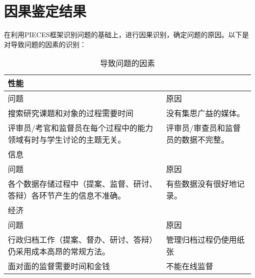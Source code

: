 \section{因果鉴定结果}

在利用PIECES框架识别问题的基础上，进行因果识别，确定问题的原因。以下是对导致问题的因素的识别：

\begin{table}[htbp]
      \centering
      \song\wuhao
      \caption{导致问题的因素}
      \label{导致问题的因素}
      \begin{tabular}{p{6cm}p{6cm}}
            \hline
            \multicolumn{2}{l}{性能}                                                                                                            \\ \hline
            问题                                                                 & 原因                                                         \\
            搜索研究课题和对象的过程需要时间                                     & 没有集思广益的媒体。                                         \\
            评审员/考官和监督员在每个过程中的能力领域有时与学生讨论的主题无关。  & 评审员/审查员和监督员的数据不完整。                          \\ \hline
            \multicolumn{2}{l}{信息}                                                                                                            \\ \hline
            问题                                                                 & 原因                                                         \\
            各个数据存储过程中（提案、监督、研讨、答辩）各环节产生的信息不准确。 & 有些数据没有很好地记录。                                     \\ \hline
            \multicolumn{2}{l}{经济}                                                                                                            \\ \hline
            问题                                                                 & 原因                                                         \\
            行政归档工作（提案、督办、研讨、答辩）仍采用成本高昂的常规方法。     & 管理归档过程仍使用纸张                                       \\
            面对面的监督需要时间和金钱                                           & 不能在线监督                                                 \\

\end{tabular}
\end{table}

